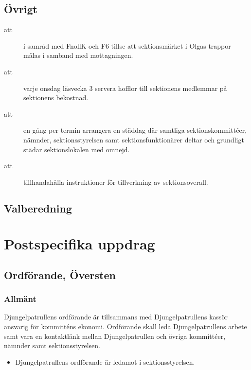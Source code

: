 \documentclass[a4paper]{article}
\begin{document}
\begin{foreningenv}{\forening{}}
    \subsection{Övrigt}
    \begin{description}
        \item[att] i samråd med FnollK och F6 tillse att sektionsmärket i Olgas trappor målas i samband med mottagningen.
        \item[att] varje onsdag läsvecka 3 servera hofflor till sektionens medlemmar på sektionens bekostnad.
        \item[att] en gång per termin arrangera en städdag där samtliga sektionskommittéer, nämnder, sektionsstyrelsen samt sektionsfunktionärer deltar och grundligt städar sektionslokalen med omnejd.
        \item[att] tillhandahålla instruktioner för tillverkning av sektionsoverall.
    \end{description}
    
    \subsection{Valberedning}
    \aliggvalber{}
    
    \section{Postspecifika uppdrag}
    \subsection{Ordförande, Översten}
    \subsubsection{Allmänt}
    Djungelpatrullens ordförande är tillsammans med Djungelpatrullens kassör ansvarig för kommitténs ekonomi. Ordförande skall leda Djungelpatrullens arbete samt vara en kontaktlänk mellan Djungelpatrullen och övriga kommittéer, nämnder samt sektionsstyrelsen.
    \begin{itemize}
        \item Djungelpatrullens ordförande är ledamot i sektionsstyrelsen.
    \end{itemize}
    

\end{foreningenv}
\end{document}
